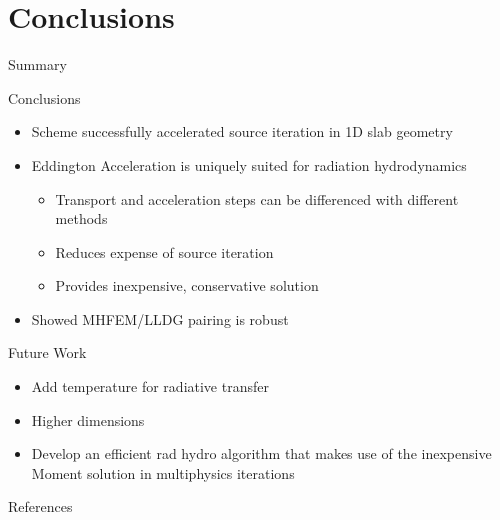 \documentclass[10pt]{beamer}
\begin{document}
\section{Conclusions}

\begin{frame}{Summary}

	\onslide<+->
	Conclusions
	\begin{itemize} \vspace{-.1in}
		\item Scheme successfully accelerated source iteration in 1D slab geometry

		\item Eddington Acceleration is uniquely suited for radiation hydrodynamics 
		\begin{itemize}
			\item Transport and acceleration steps can be differenced with different methods 
			\item Reduces expense of source iteration 
			\item Provides inexpensive, conservative solution 
		\end{itemize}

		\item Showed MHFEM/LLDG pairing is robust 

	\end{itemize}

	\onslide<+->
	Future Work 
	\begin{itemize} \vspace{-.1in}

		\item Add temperature for radiative transfer 

		\item Higher dimensions 

		\item Develop an efficient rad hydro algorithm that makes use of the inexpensive Moment solution in multiphysics iterations 

	\end{itemize}

\end{frame}

\appendix

\begin{frame}{References}

	\nocite{adams,morel,llnl,alcouffe,mhfem,hydro,bolding,nonlinearAccel}
	
	

\end{frame}
\end{document}
